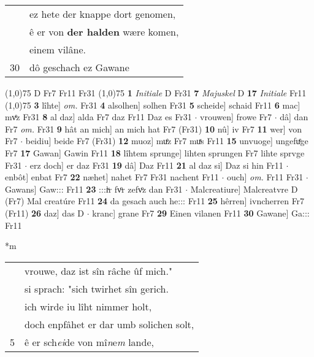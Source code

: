 \documentclass[8pt,a4paper,notitlepage]{article}
\begin{document}
\begin{table}[ht]
\begin{minipage}[t]{0.5\linewidth}
\begin{tabular}{rl}
 & ez hete der knappe dort genomen,\\ 
 & ê er von \textbf{der halden} wære komen,\\ 
 & einem vilâne.\\ 
30 & dô geschach ez Gawane\\ 
\end{tabular}
\scriptsize
\line(1,0){75} \newline
D Fr7 Fr11 Fr31 \newline
\line(1,0){75} \newline
\textbf{1} \textit{Initiale} D Fr31  \textbf{7} \textit{Majuskel} D  \textbf{17} \textit{Initiale} Fr11  \newline
\line(1,0){75} \newline
\textbf{3} lîhte] \textit{om.} Fr31 \textbf{4} alsolhen] solhen Fr31 \textbf{5} scheide] schaid Fr11 \textbf{6} mac] mvͤz Fr31 \textbf{8} al daz] alda Fr7 daz Fr11 Daz es Fr31  $\cdot$ vrouwen] frowe Fr7  $\cdot$ dâ] dan Fr7 \textit{om.} Fr31 \textbf{9} hât an mich] an mich hat Fr7 (Fr31) \textbf{10} nû] iv Fr7 \textbf{11} wer] von Fr7  $\cdot$ beidiu] beide Fr7 (Fr31) \textbf{12} muoz] muͤz Fr7 muͯs Fr11 \textbf{15} unvuoge] ungefuͤge Fr7 \textbf{17} Gawan] Gawin Fr11 \textbf{18} lîhtem sprunge] lihten sprungen Fr7 lihte sprvge Fr31  $\cdot$ erz doch] er daz Fr31 \textbf{19} dâ] Daz Fr11 \textbf{21} al daz si] Daz si hin Fr11  $\cdot$ enbôt] enbat Fr7 \textbf{22} næhet] nahet Fr7 Fr31 nachent Fr11  $\cdot$ ouch] \textit{om.} Fr11 Fr31  $\cdot$ Gawans] Gaw::: Fr11 \textbf{23} :::iͮr fvͦr zefvͦz dan Fr31  $\cdot$ Malcreatiure] Malcreatvre D (Fr7) Mal creatúre Fr11 \textbf{24} da gesach auch he::: Fr11 \textbf{25} hêrren] ivncherren Fr7 (Fr11) \textbf{26} daz] das D  $\cdot$ kranc] grane Fr7 \textbf{29} Einen vilanen Fr11 \textbf{30} Gawane] Ga::: Fr11 \newline
\end{minipage}
\hspace{0.5cm}
\begin{minipage}[t]{0.5\linewidth}
\small
\begin{center}*m
\end{center}
\begin{tabular}{rl}
 & vrouwe, daz ist sîn râche ûf mich."\\ 
 & si sprach: "sich twirhet sîn gerich.\\ 
 & ich wirde iu lîht nimmer holt,\\ 
 & doch enpfâhet er dar umb solichen solt,\\ 
5 & ê er sch\textit{ei}de von mî\textit{n}e\textit{m} lande,\\ 

\end{tabular}
\end{minipage}
\end{table}
\end{document}

